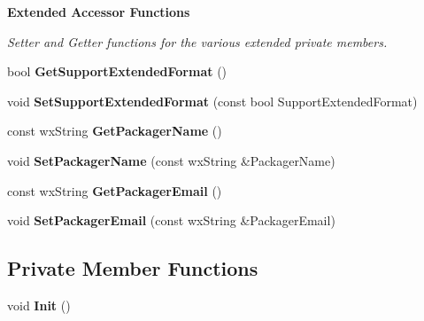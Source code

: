 \begin{Indent}{\bf Extended Accessor Functions}\par
{\em Setter and Getter functions for the various extended private members. }\begin{CompactItemize}
\item 
bool {\bf Get\-Support\-Extended\-Format} ()
\item 
void {\bf Set\-Support\-Extended\-Format} (const bool Support\-Extended\-Format)
\item 
const wx\-String {\bf Get\-Packager\-Name} ()
\item 
void {\bf Set\-Packager\-Name} (const wx\-String \&Packager\-Name)
\item 
const wx\-String {\bf Get\-Packager\-Email} ()
\item 
void {\bf Set\-Packager\-Email} (const wx\-String \&Packager\-Email)
\end{CompactItemize}
\end{Indent}
\subsection*{Private Member Functions}
\begin{CompactItemize}
\item 
void {\bf Init} ()
\end{CompactItemize}
